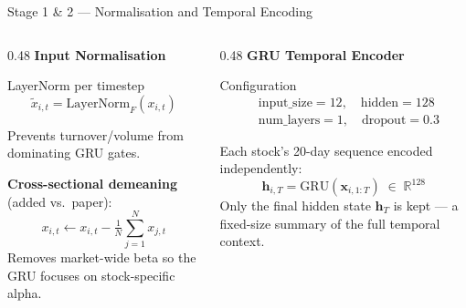 \documentclass[aspectratio=169, 10pt]{beamer}
\newcommand{\myvec}[1]{\mathbf{#1}}
\begin{document}
\begin{frame}{Stage 1 \& 2 — Normalisation and Temporal Encoding}
  \begin{columns}[T]
    \begin{column}{0.48\textwidth}
      \textbf{Input Normalisation}

      \begin{block}{LayerNorm per timestep}
        \vspace{-0.4em}
        \[ \tilde{x}_{i,t} = \text{LayerNorm}_F(x_{i,t}) \]
        \vspace{-0.6em}
      \end{block}
      Prevents turnover/volume from dominating GRU gates.

      \smallskip
      \textbf{Cross-sectional demeaning}
      \textcolor{negative}{\footnotesize(added vs.\ paper)}:
      \[
        x_{i,t} \leftarrow x_{i,t} - \tfrac{1}{N}\textstyle\sum_{j=1}^N x_{j,t}
      \]
      Removes market-wide beta so the GRU focuses on stock-specific alpha.
    \end{column}
    \begin{column}{0.48\textwidth}
      \textbf{GRU Temporal Encoder}

      \begin{block}{Configuration}
        \vspace{-0.4em}
        \begin{align*}
          &\text{input\_size}=12,\quad\text{hidden}=128\\[-2pt]
          &\text{num\_layers}=1,\quad\text{dropout}=0.3
        \end{align*}
        \vspace{-0.6em}
      \end{block}

      Each stock's 20-day sequence encoded independently:
      \[
        \myvec{h}_{i,T} = \text{GRU}(\myvec{x}_{i,1:T}) \;\in\; \mathbb{R}^{128}
      \]
      Only the final hidden state $\myvec{h}_T$ is kept — a fixed-size
      summary of the full temporal context.
    \end{column}
  \end{columns}
\end{frame}
\end{document}
